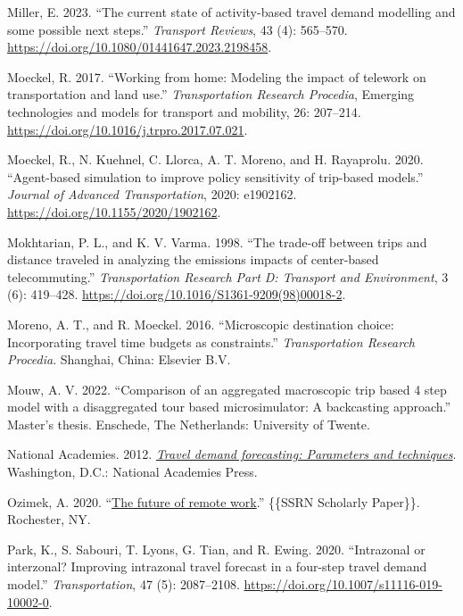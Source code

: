 \documentclass[fancy, twoside, mastersfancy, ms]{byuthesis}
\newlength{\cslhangindent}
\newenvironment{CSLReferences}[2] %
 {\begin{list}{}{%
  \setlength{\itemindent}{0pt}
  \setlength{\leftmargin}{0pt}
  \setlength{\parsep}{0pt}
  \ifodd #1
   \setlength{\leftmargin}{\cslhangindent}
   \setlength{\itemindent}{-1\cslhangindent}
  \fi
  \setlength{\itemsep}{#2\baselineskip}}}
 {\end{list}}
\begin{document}
\begin{CSLReferences}{1}{0}
Miller, E. 2023. {``The current state of activity-based travel demand
modelling and some possible next steps.''} \emph{Transport Reviews}, 43
(4): 565--570. \url{https://doi.org/10.1080/01441647.2023.2198458}.

Moeckel, R. 2017. {``Working from home: Modeling the impact of telework
on transportation and land use.''} \emph{Transportation Research
Procedia}, Emerging technologies and models for transport and mobility,
26: 207--214. \url{https://doi.org/10.1016/j.trpro.2017.07.021}.

Moeckel, R., N. Kuehnel, C. Llorca, A. T. Moreno, and H. Rayaprolu.
2020. {``Agent-based simulation to improve policy sensitivity of
trip-based models.''} \emph{Journal of Advanced Transportation}, 2020:
e1902162. \url{https://doi.org/10.1155/2020/1902162}.

Mokhtarian, P. L., and K. V. Varma. 1998. {``The trade-off between trips
and distance traveled in analyzing the emissions impacts of center-based
telecommuting.''} \emph{Transportation Research Part D: Transport and
Environment}, 3 (6): 419--428.
\url{https://doi.org/10.1016/S1361-9209(98)00018-2}.

Moreno, A. T., and R. Moeckel. 2016. {``Microscopic destination choice:
Incorporating travel time budgets as constraints.''}
\emph{Transportation {Research Procedia}}. Shanghai, China: Elsevier
B.V.

Mouw, A. V. 2022. {``Comparison of an aggregated macroscopic trip based
4 step model with a disaggregated tour based microsimulator: A
backcasting approach.''} Master's thesis. Enschede, The Netherlands:
University of Twente.

National Academies. 2012.
\emph{\href{https://doi.org/10.17226/14665}{Travel demand forecasting:
Parameters and techniques}}. Washington, D.C.: National Academies Press.

Ozimek, A. 2020. {``\href{https://doi.org/10.2139/ssrn.3638597}{The
future of remote work}.''} \{\{SSRN Scholarly Paper\}\}. Rochester, NY.

Park, K., S. Sabouri, T. Lyons, G. Tian, and R. Ewing. 2020.
{``Intrazonal or interzonal? {Improving} intrazonal travel forecast in a
four-step travel demand model.''} \emph{Transportation}, 47 (5):
2087--2108. \url{https://doi.org/10.1007/s11116-019-10002-0}.


\end{CSLReferences}
\end{document}
